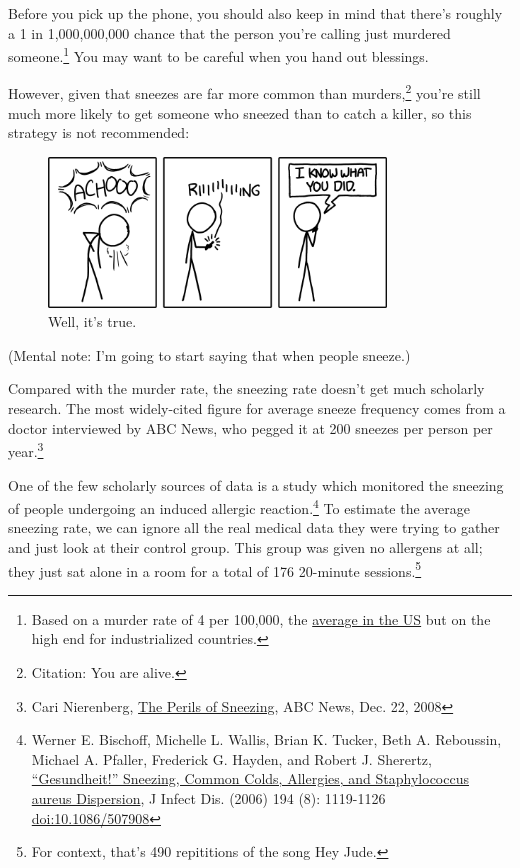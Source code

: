 {{Before you pick up the phone, you should also keep in mind that there's roughly a 1 in 1,000,000,000 chance that the person you're calling just murdered someone.{\footnote{Based on a murder rate of 4 per 100,000, the \href{http://www.fbi.gov/about-us/cjis/ucr/crime-in-the-u.s/2011/crime-in-the-u.s.-2011}{average in the US} but on the high end for industrialized countries.} } You may want to be careful when you hand out blessings.}

{However, given that sneezes are far more common than murders,{\footnote{Citation: You are alive.} } you're still much more likely to get someone who sneezed than to catch a killer, so this strategy is not recommended:}

\begin{figure}[!htbp]
\centering
\includegraphics[scale=0.5, max width=0.8\textwidth]{imgs/a/55/sneeze_murder.png}
\caption{Well, it's true.}
\end{figure}

{(Mental note: I'm going to start saying that when people sneeze.)}

{Compared with the murder rate, the sneezing rate doesn't get much scholarly research. The most widely-cited figure for average sneeze frequency comes from a doctor interviewed by ABC News, who pegged it at 200 sneezes per person per year.{\footnote{Cari Nierenberg, \href{http://abcnews.go.com/Health/ColdandFluNews/story?id=6479792&page=1}{The Perils of Sneezing}, ABC News, Dec. 22, 2008} } }

{One of the few scholarly sources of data is a study which monitored the sneezing of people undergoing an induced allergic reaction.{\footnote{Werner E. Bischoff, Michelle L. Wallis, Brian K. Tucker, Beth A. Reboussin, Michael A. Pfaller, Frederick G. Hayden, and Robert J. Sherertz, \href{http://jid.oxfordjournals.org/content/194/8/1119.full}{“Gesundheit!” Sneezing, Common Colds, Allergies, and Staphylococcus aureus Dispersion}, J Infect Dis. (2006) 194 (8): 1119-1126 \href{doi:10.1086/507908} {doi:10.1086/507908}} } To estimate the average sneezing rate, we can ignore all the real medical data they were trying to gather and just look at their control group. This group was given no allergens at all; they just sat alone in a room for a total of 176 20-minute sessions.{\footnote{For context, that's 490 repititions of the song Hey Jude.} } }

}

